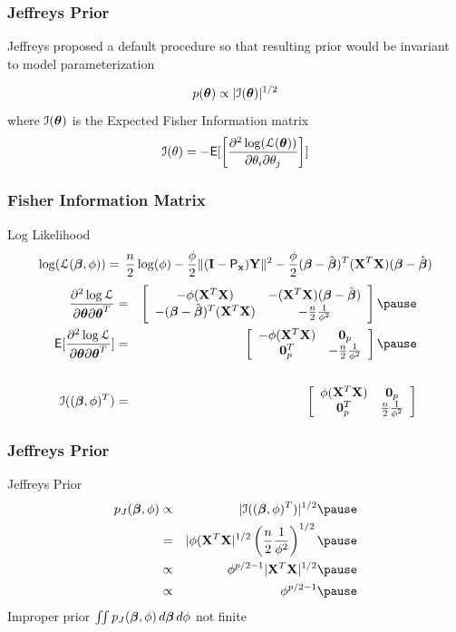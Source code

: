\documentclass[handout]{beamer}
\begin{document}
\begin{frame}
  \frametitle{Jeffreys Prior}
  
Jeffreys proposed a default  procedure so that resulting prior
would be invariant to model parameterization  \pause

$$p(\boldsymbol{\theta}) \propto |{\cal{I}}(\boldsymbol{\theta})|^{1/2}$$
\pause
where ${\cal{I}}(\boldsymbol{\theta})$ is the  Expected Fisher Information matrix
\pause
$$
{\cal{I}}(\theta) = - \textsf{E}[ \left[ \frac{\partial^2 \log({\cal{L}}(\boldsymbol{\theta}))}{\partial
  \theta_i \partial \theta_j} \right] ]
$$
\end{frame}
\begin{frame}
  \frametitle{Fisher Information Matrix}
Log Likelihood
$$
    \log({\cal{L}}(\boldsymbol{\beta}, \phi))  =  \, \frac{n}{2} \log(\phi)  - \frac{\phi}{2}
     \| (\mathbf{I} - \textsf{P}_{\mathbf{x}}) \mathbf{Y}\|^2  
 - \frac{\phi}{2}(\boldsymbol{\beta} - \hat{\boldsymbol{\beta}})^T(\mathbf{X}^T\mathbf{X})(\boldsymbol{\beta} - \hat{\boldsymbol{\beta}}) 
$$ \pause
  \begin{eqnarray*}
\frac{\partial^2 \log \cL} { \partial \t \partial \t^T} & = &
\left[
  \begin{array}{cc}
    -\phi (\X^T\X) & -(\X^T\X) (\b - \bhat) \\
  - (\b - \bhat)^T (\X^T\X) & -\frac{n}{2} \frac{1}{\phi^2} \\
  \end{array}
\right] \pause \\
\E[\frac{\partial^2 \log \cL} { \partial \t \partial \t^T}] & = &
\left[
  \begin{array}{cc}
    -\phi (\X^T\X) & \zero_p \\
  \zero_p^T & -\frac{n}{2} \frac{1}{\phi^2} \\
  \end{array}
\right] \pause \\
& & \\
\cI((\b, \phi)^T) & = & \left[
  \begin{array}{cc}
    \phi (\X^T\X) & \zero_p \\
  \zero_p^T & \frac{n}{2} \frac{1}{\phi^2} 
  \end{array}
\right]
  \end{eqnarray*}
\end{frame}
\begin{frame}
  \frametitle{Jeffreys Prior}
  Jeffreys Prior 
  \begin{eqnarray*}
  p_J(\b, \phi)  & \propto & |\cI((\b, \phi)^T) |^{1/2}   \pause \\
               & = & |\phi (\X^T\X|^{1/2} \left(\frac{n}{2}
                 \frac{1}{\phi^2} \right)^{1/2} \pause \\
  & \propto  &  \phi^{p/2 - 1} |\X^T\X|^{1/2} \pause \\
  & \propto & \phi^{p/2 - 1}  \pause
  \end{eqnarray*}
  Improper prior   $\iint p_J(\boldsymbol{\beta}, \phi) \, d\boldsymbol{\beta} \, d\phi $ not finite
  
\end{frame}
\end{document}
